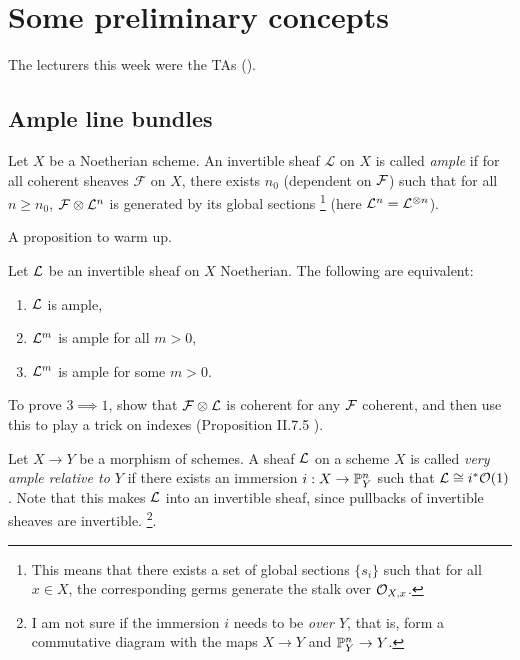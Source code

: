 \chapter{Some preliminary concepts}
The lecturers this week were the TAs ().
\section{Ample line bundles}

\begin{definition}
	Let $X$ be a Noetherian scheme. An invertible sheaf $\mathcal{L}$ on $X$ is called \emph{ample} if for all coherent sheaves $\mathcal{F}$ on $X$, there exists $n_0$ (dependent on $\mathcal{F}$) such that for all $n \geq n_0$, $\mathcal{F} \otimes \mathcal{L}^n$ is generated by its global sections \footnote{This means that there exists a set of global sections $\{s_i\}$ such that for all $x \in X$, the corresponding germs generate the stalk over $\mathcal{O}_{X,x}$.} (here $\mathcal{L}^n = \mathcal{L}^{\otimes n}$).
\end{definition}

A proposition to warm up.
\begin{proposition} Let $\mathcal{L}$ be an invertible sheaf on $X$ Noetherian.
	The following are equivalent: \begin{enumerate}
    	\item $\mathcal{L}$ is ample,
		\item $\mathcal{L}^m$ is ample for all $m > 0$,
		\item $\mathcal{L}^m$ is ample for some $m > 0$.
    \end{enumerate}
\end{proposition}

To prove $3 \implies 1$, show that $\mathcal{F} \otimes \mathcal{L}$ is coherent for any $\mathcal{F}$ coherent, and then use this to play a trick on indexes (Proposition II.7.5 \cite{hartshorne2013algebraic}).

\begin{definition}\label{def:very-ample}
	Let $X \to Y$ be a morphism of schemes. A sheaf $\mathcal{L}$ on a scheme $X$ is called \emph{very ample relative to $Y$} if there exists an immersion  $i: X \to \mathbb{P}^n_Y$ such that $\mathcal{L} \cong i^* \mathcal{O}(1)$. Note that this makes $\mathcal{L}$ into an invertible sheaf, since pullbacks of invertible sheaves are invertible. \footnote{I am not sure if the immersion $i$ needs to be \emph{over $Y$}, that is, form a commutative diagram with the maps $X \to Y$ and $\mathbb{P}^n_Y \to Y$.}. 
\end{definition}

